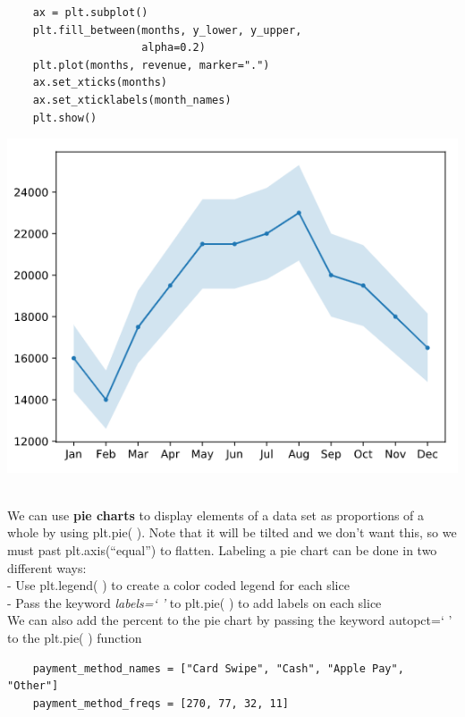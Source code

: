 \documentclass[11pt, a4paper]{article}
\begin{document}
\begin{spacing}{1.1}
\begin{minipage}[c]{9.2cm}
\begin{lstlisting}
	ax = plt.subplot()
	plt.fill_between(months, y_lower, y_upper, 
	                 alpha=0.2)
	plt.plot(months, revenue, marker=".")
	ax.set_xticks(months)
	ax.set_xticklabels(month_names)
	plt.show() \end{lstlisting}\vspace*{1mm}
	\end{minipage}
	\begin{minipage}[c]{8cm}
		\includegraphics[scale=.57]{lineerr}
	\end{minipage} \vspace*{1mm} \\
	We can use \textbf{pie charts} to display elements of a data set as proportions of a whole by using plt.pie( ). Note that it will be tilted and we don't want this, so we must past plt.axis(``equal'') to flatten. Labeling a pie chart can be done in two different ways: \\ 
	\hspace*{3mm} - Use plt.legend( ) to create a color coded legend for each slice \\
	\hspace*{3mm} - Pass the keyword \textit{labels=` '} to plt.pie( ) to add labels on each slice \\
	We can also add the percent to the pie chart by passing the keyword autopct=` ' to the plt.pie( ) function
	\begin{lstlisting}
	payment_method_names = ["Card Swipe", "Cash", "Apple Pay", "Other"]
	payment_method_freqs = [270, 77, 32, 11]
	

\end{lstlisting}
\end{spacing}
\end{document}
